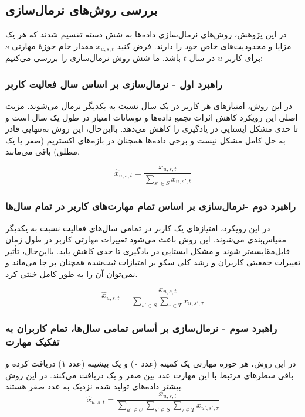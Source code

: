 \subsection{بررسی روش‌های نرمال‌سازی}
در این پژوهش، روش‌های نرمال‌سازی داده‌ها به شش دسته‌ تقسیم شدند که هر یک مزایا و محدودیت‌های خاص خود را دارند.
فرض کنید $x_{u,s,t}$ مقدار خام حوزهٔ مهارتی $s$ برای کاربر $u$ در سال $t$ باشد. ما شش روش نرمال‌سازی را بررسی می‌کنیم:

\subsubsection*{راهبرد اول - نرمال‌سازی بر اساس سال فعالیت کاربر}
در این روش، امتیازهای هر کاربر در یک سال نسبت به یکدیگر نرمال می‌شوند. مزیت اصلی این رویکرد کاهش اثرات تجمع داده‌ها و نوسانات امتیاز در طول یک سال است و تا حدی مشکل ایستایی در یادگیری را کاهش می‌دهد. بااین‌حال، این روش به‌تنهایی قادر به حل کامل مشکل نیست و برخی داده‌ها همچنان در بازه‌های اکستریم (صفر یا یک مطلق) باقی می‌مانند.

\begin{equation}
\hat{x}_{u,s,t} = \frac{x_{u,s,t}}{\sum_{s' \in S} x_{u,s',t}}   
\end{equation}
\subsubsection*{راهبرد دوم -نرمال‌سازی بر اساس تمام مهارت‌های کاربر در تمام سال‌ها}    
در این رویکرد، امتیازهای یک کاربر در تمامی سال‌های فعالیت نسبت به یکدیگر مقیاس‌بندی می‌شوند. این روش باعث می‌شود تغییرات مهارتی کاربر در طول زمان قابل‌مقایسه‌تر شوند و مشکل ایستایی در یادگیری تا حدی کاهش یابد. بااین‌حال، تأثیر تغییرات جمعیتی کاربران و رشد کلی سکو بر امتیازات ثبت‌شده همچنان بر جا می‌ماند و نمی‌توان آن را به طور کامل خنثی کرد.

\begin{equation}
\hat{x}_{u,s,t} = \frac{x_{u,s,t}}{\sum_{s' \in S}\sum_{\tau \in T} x_{u,s',\tau}}
\end{equation}
\subsubsection*{راهبرد سوم - نرمال‌سازی بر أساس تمامی سال‌ها، تمام کاربران به تفکیک مهارت}

در این روش، هر حوزه مهارتی یک کمینه (عدد ۰) و یک بیشینه (عدد ۱) دریافت کرده و باقی سطر‌های مرتبط با این مهارت عدد بین صفر و یک دریافت می‌کنند. در این روش بیشتر داده‌های تولید شده نزدیک به عدد صفر هستند.
\begin{equation}
\hat{x}_{u,s,t} = \frac{x_{u,s,t}}{\sum_{u' \in U}\sum_{s' \in S}\sum_{\tau \in T} x_{u',s',\tau}}
\end{equation}


